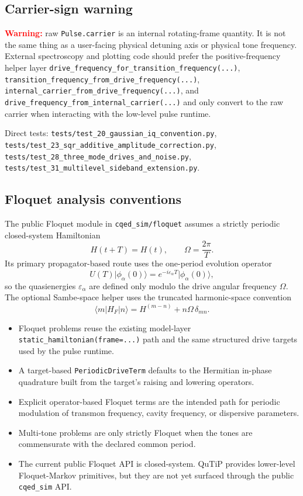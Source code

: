 \documentclass[11pt]{article}
\begin{document}
\subsection*{Carrier-sign warning}
\textcolor{red}{\textbf{Warning:}} raw \texttt{Pulse.carrier} is an internal
rotating-frame quantity. It is not the same thing as a user-facing physical
detuning axis or physical tone frequency. External spectroscopy and plotting
code should prefer the positive-frequency helper layer
\texttt{drive\_frequency\_for\_transition\_frequency(...)},
\texttt{transition\_frequency\_from\_drive\_frequency(...)},
\texttt{internal\_carrier\_from\_drive\_frequency(...)}, and
\texttt{drive\_frequency\_from\_internal\_carrier(...)} and only convert to the
raw carrier when interacting with the low-level pulse runtime.

\noindent
Direct tests:
\texttt{tests/test\_20\_gaussian\_iq\_convention.py},
\texttt{tests/test\_23\_sqr\_additive\_amplitude\_correction.py},
\texttt{tests/test\_28\_three\_mode\_drives\_and\_noise.py},
\texttt{tests/test\_31\_multilevel\_sideband\_extension.py}.

\subsection*{Floquet analysis conventions}
The public Floquet module in \texttt{cqed\_sim/floquet} assumes a strictly
periodic closed-system Hamiltonian
\[
H(t + T) = H(t),
\qquad
\Omega = \frac{2\pi}{T}.
\]
Its primary propagator-based route uses the one-period evolution operator
\[
U(T) \lvert \phi_\alpha(0) \rangle = e^{-i \varepsilon_\alpha T} \lvert \phi_\alpha(0) \rangle,
\]
so the quasienergies \(\varepsilon_\alpha\) are defined only modulo the drive
angular frequency \(\Omega\). The optional Sambe-space helper uses the truncated
harmonic-space convention
\[
\langle m \vert H_F \vert n \rangle = H^{(m-n)} + n\Omega\,\delta_{mn}.
\]

\begin{itemize}[leftmargin=1.5em]
  \item Floquet problems reuse the existing model-layer
  \texttt{static\_hamiltonian(frame=...)} path and the same structured drive
  targets used by the pulse runtime.
  \item A target-based \texttt{PeriodicDriveTerm} defaults to the Hermitian
  in-phase quadrature built from the target's raising and lowering operators.
  \item Explicit operator-based Floquet terms are the intended path for
  periodic modulation of transmon frequency, cavity frequency, or dispersive
  parameters.
  \item Multi-tone problems are only strictly Floquet when the tones are
  commensurate with the declared common period.
  \item The current public Floquet API is closed-system. QuTiP provides
  lower-level Floquet-Markov primitives, but they are not yet surfaced through
  the public \texttt{cqed\_sim} API.
\end{itemize}
\end{document}
